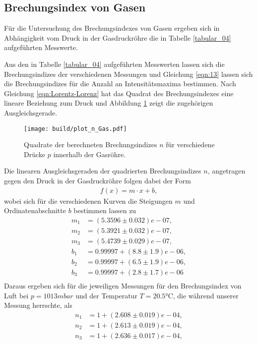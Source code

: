 \subsection{Brechungsindex von Gasen}
\noindent Für die Untersuchung des Brechungsindexes von Gasen ergeben sich in
Abhängigkeit vom Druck in der Gasdruckröhre die in Tabelle \ref{tabular_04}
aufgeführten Messwerte. \\
\FloatBarrier

\FloatBarrier
\noindent Aus den in Tabelle \ref{tabular_04} aufgeführten Messwerten lassen sich
die Brechungsindizes der verschiedenen Messungen und Gleichung \ref{eqn:13}
lassen sich die Brechungsindizes für die Anzahl an Intensitätsmaxima bestimmen.
Nach Gleichung \ref{eqn:Lorentz-Lorenz} hat das Quadrat des Brechungsindexes eine lineare Beziehung zum Druck
und Abbildung \ref{fig:03} zeigt die zugehörigen Ausgleichsgerade. \\
\FloatBarrier
\begin{figure}
  \centering
  \texttt{[image: build/plot\_n\_Gas.pdf]}
  \caption{Quadrate der berechneten Brechungsindizes $n$ für verschiedene Drücke
  $p$ innerhalb der Gasröhre.}
  \label{fig:03}
\end{figure}
\FloatBarrier
\noindent Die linearen Ausgleichsgeraden der quadrierten Brechungsindizes $n$,
angetragen gegen den Druck in der Gasdruckröhre folgen dabei der Form
\begin{align}
  f(x) = m \cdot x + b,
\end{align}
wobei sich für die verschiedenen Kurven die Steigungen $m$ und Ordinatenabschnitte
$b$ bestimmen lassen zu
\begin{align*}
  m_1 &= (5.3596 \pm 0.032)e-07, \\
  m_2 &= (5.3921 \pm 0.032)e-07, \\
  m_3 &= (5.4739 \pm 0.029)e-07, \\
  b_1 &= 0.99997 + (8.8 \pm 1.9)e-06, \\
  b_2 &= 0.99997 + (6.5 \pm 1.9)e-06, \\
  b_3 &= 0.99997 + (2.8 \pm 1.7)e-06 \\
\end{align*}
%
%
%
%
\noindent Daraus ergeben sich für die jeweiligen Messungen für den Brechungsindex
von Luft bei $p = 1013\si{mbar}$ und der Temperatur $T = 20.5\si{\celsius}$, die während unserer Messung herrschte, als
\begin{align}
  n_1 &= 1 + (2.608 \pm 0.019)e-04, \\
  n_2 &= 1 + (2.613 \pm 0.019)e-04, \\
  n_3 &= 1 + (2.636 \pm 0.017)e-04, \\
\end{align}
